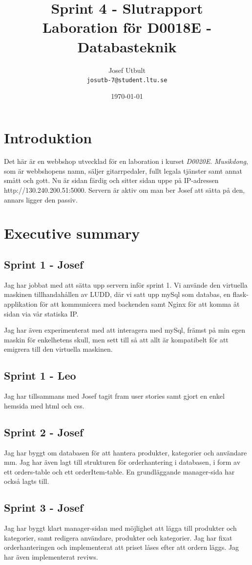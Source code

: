 \documentclass[a4paper]{article}
\title{Sprint 4 - Slutrapport \\ 
\large{Laboration för D0018E - Databasteknik}}
\author{Josef Utbult \\
{\tt josutb-7@student.ltu.se}}
\date{\today}
\begin{document}
\maketitle
\newpage
\section{Introduktion}
Det här är en webbshop utvecklad för en laboration i kurset \textit{D0020E}. \textit{Musikdong}, som är webbshopens namn, säljer gitarrpedaler, fullt legala tjänster samt annat smått och gott. Nu är sidan färdig och sitter sidan uppe på IP-adressen http://130.240.200.51:5000. Servern är aktiv om man ber Josef att sätta på den, annars ligger den passiv.

\section{Executive summary}
\subsection{Sprint 1 - Josef}
Jag har jobbat med att sätta upp servern inför sprint 1. Vi använde den virtuella maskinen tillhandahållen av LUDD, där vi satt upp mySql som databas, en flask-applikation för att kommunicera med backenden samt Nginx för att komma åt sidan via vår statiska IP.

Jag har även experimenterat med att interagera med mySql, främst på min egen maskin för enkelhetens skull, men sett till så att allt är kompatibelt för att emigrera till den virtuella maskinen.

\subsection{Sprint 1 - Leo}
Jag har tillsammans med Josef tagit fram user stories samt gjort en enkel hemsida med html och css. 

\subsection{Sprint 2 - Josef}
Jag har byggt om databasen för att hantera produkter, kategorier och användare mm. Jag har även lagt till strukturen för orderhantering i databasen, i form av ett orders-table och ett orderItem-table. En grundläggande manager-sida har också lagts till.

\subsection{Sprint 3 - Josef}
Jag har byggt klart manager-sidan med möjlighet att lägga till produkter och kategorier, samt redigera användare, produkter och kategorier. Jag har fixat orderhanteringen och implementerat att priset låses efter att ordern läggs. Jag har även implementerat reviws. 
\end{document}
